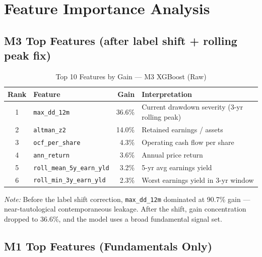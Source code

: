 \documentclass{report}\usepackage[]{graphicx}\usepackage[table]{xcolor}
\begin{document}
\section{Feature Importance Analysis}

\subsection{M3 Top Features (after label shift + rolling peak fix)}

\begin{table}[H]
\centering
\caption{Top 10 Features by Gain — M3 XGBoost (Raw)}
\begin{tabular}{clrl}
\toprule
\textbf{Rank} & \textbf{Feature} & \textbf{Gain} & \textbf{Interpretation} \\
\midrule
1 & \texttt{max\_dd\_12m} & 36.6\% & Current drawdown severity (3-yr rolling peak) \\
2 & \texttt{altman\_z2} & 14.0\% & Retained earnings / assets \\
3 & \texttt{ocf\_per\_share} & 4.3\% & Operating cash flow per share \\
4 & \texttt{ann\_return} & 3.6\% & Annual price return \\
5 & \texttt{roll\_mean\_5y\_earn\_yld} & 3.2\% & 5-yr avg earnings yield \\
6 & \texttt{roll\_min\_3y\_earn\_yld} & 2.3\% & Worst earnings yield in 3-yr window \\
\bottomrule
\end{tabular}
\end{table}

\noindent \textit{Note:} Before the label shift correction, \texttt{max\_dd\_12m} dominated 
at 90.7\% gain — near-tautological contemporaneous leakage. After the shift, 
gain concentration dropped to 36.6\%, and the model uses a broad fundamental signal set.

\subsection{M1 Top Features (Fundamentals Only)}
\end{document}
